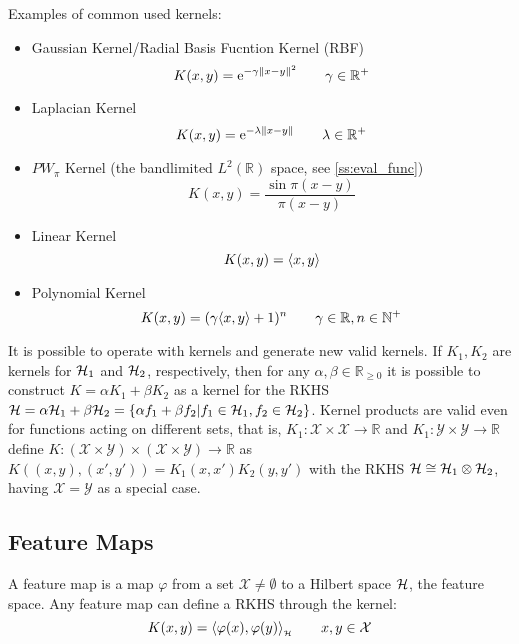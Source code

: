 Examples of common used kernels:
\begin{itemize}
  \item Gaussian Kernel/Radial Basis Fucntion Kernel (RBF)
  \begin{equation}
  \label{eq:rbf}
  K(x,y) = \mathrm{e}^{-\gamma\left\lVert x-y\right\rVert^2} \qquad \gamma \in \mathbb{R}^+
  \end{equation}
  \item Laplacian Kernel
  \begin{equation*}
  K(x,y) = \mathrm{e}^{-\lambda\left\lVert x-y\right\rVert} \qquad \lambda \in \mathbb{R}^+
  \end{equation*}
  \item $PW_\pi$ Kernel (the bandlimited $L^2(\mathbb{R})$ space, see
  \ref{ss:eval_func})
  \begin{equation*}
  K(x,y) = \frac{\sin \pi(x-y)}{\pi(x-y)}
  \end{equation*}
  \item Linear Kernel
  \begin{equation*}
  K(x,y) = \langle x,y\rangle
  \end{equation*}
  \item Polynomial Kernel
  \begin{equation*}
  K(x,y) = (\gamma\langle x,y\rangle+1)^n \qquad \gamma \in \mathbb{R}, n \in
  \mathbb{N}^+
  \end{equation*}
\end{itemize}

It is possible to operate with kernels and generate new valid kernels. If
$K_1,K_2$ are kernels for $\mathcal{H}_1$ and $\mathcal{H}_2$, respectively, then for any
$\alpha,\beta \in \mathbb{R}_{\scriptstyle\geq0}$ it is possible to construct $K
= \alpha K_1 + \beta K_2$ as a kernel for the RKHS $\mathcal{H} = \alpha\mathcal{H}_1 +
\beta\mathcal{H}_2 = \{ \alpha f_1 + \beta f_2 | f_1 \in \mathcal{H}_1, f_2 \in
\mathcal{H}_2\}$. Kernel products are valid even for functions acting on different sets,
that is, $K_1:\mathcal{X}\times\mathcal{X}\to\mathbb{R}$ and
$K_1:\mathcal{Y}\times\mathcal{Y}\to\mathbb{R}$ define
$K:(\mathcal{X}\times\mathcal{Y})\times(\mathcal{X}\times\mathcal{Y})\to\mathbb{R}$
as $K((x,y),(x',y'))=K_1(x,x')K_2(y,y')$ with the RKHS $\mathcal{H} \cong \mathcal{H}_1 \otimes
\mathcal{H}_2$, having $\mathcal{X}=\mathcal{Y}$ as a special case.

\subsection{Feature Maps}

A feature map is a map $\varphi$ from a set $\mathcal{X}\neq\emptyset$ to a
Hilbert space $\mathcal{H}$, the feature space. Any feature map can define a RKHS
through the kernel:
\begin{equation}
\label{eq:feature_kernel}
K(x,y)=\langle \varphi(x),\varphi(y)\rangle_{_{\mathcal{H}}} \qquad x,y \in \mathcal{X}
\end{equation}

